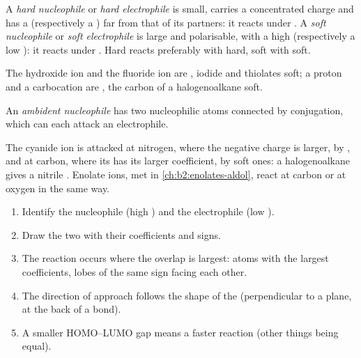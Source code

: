\begin{definition}\label{def:b2:frontier-orbitals:hard-soft}
A \emph{hard nucleophile} or \emph{hard electrophile}
 is small, carries a concentrated charge and has
a  (respectively a ) far from that of its partners: it reacts under . A \emph{soft nucleophile} or \emph{soft electrophile}
 is large and polarisable, with a high 
(respectively a low ): it reacts under . Hard reacts preferably
with hard, soft with soft.
\end{definition}

The hydroxide ion and the fluoride ion are , iodide and thiolates
soft; a proton and a carbocation are , the carbon of a
halogenoalkane soft.

\begin{definition}\label{def:b2:frontier-orbitals:ambident}
An \emph{ambident nucleophile} has two nucleophilic atoms
connected by conjugation, which can each attack an electrophile.
\end{definition}

The cyanide ion is attacked at nitrogen, where the negative charge is larger, by , and at carbon, where its  has its larger coefficient, by soft ones:
a halogenoalkane gives a nitrile . Enolate ions, met in
\cref{ch:b2:enolates-aldol}, react at carbon or at oxygen in the same way.

\begin{method}\label{met:b2:frontier-orbitals:fmo}
\begin{enumerate}
  \item Identify the nucleophile (high ) and the electrophile (low ).
  \item Draw the two  with their coefficients and signs.
  \item The reaction occurs where the overlap is largest: atoms with the largest
        coefficients, lobes of the same sign facing each other.
  \item The direction of approach follows the shape of the  (perpendicular to a
         plane, at the back of a  bond).
  \item A smaller HOMO--LUMO gap means a faster reaction (other things being equal).
\end{enumerate}
\end{method}

